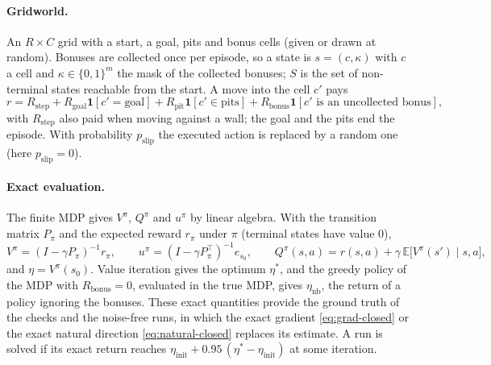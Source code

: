 \documentclass[11pt,a4paper]{article}
\numberwithin{equation}{section}
\theoremstyle{plain}
\theoremstyle{definition}
\theoremstyle{remark}
\newcommand{\E}{\mathbb{E}}
\newcommand{\T}{^{\top}}
\newcommand{\Ind}{\mathbf{1}}
\begin{document}
\paragraph{Gridworld.}
An $R\times C$ grid with a start, a goal, pits and bonus cells (given or drawn at random). Bonuses are collected once per episode, so a state is $s=(c,\kappa)$ with $c$ a cell and $\kappa\in\{0,1\}^m$ the mask of the collected bonuses; $S$ is the set of non-terminal states reachable from
the start. A move into the cell $c'$ pays
\[
  r=R_{\mathrm{step}}+R_{\mathrm{goal}}\Ind[c'=\text{goal}]+R_{\mathrm{pit}}\Ind[c'\in\text{pits}]+R_{\mathrm{bonus}}\Ind[c'\text{ is an uncollected bonus}],
\]
with $R_{\mathrm{step}}$ also paid when moving against a wall; the goal and the pits end the episode. With probability $p_{\mathrm{slip}}$ the executed action is replaced by a random one (here $p_{\mathrm{slip}}=0$).

\paragraph{Exact evaluation.}
The finite MDP gives $V^\pi$, $Q^\pi$ and $u^\pi$ by linear algebra. With the transition matrix $P_\pi$ and the expected reward $r_\pi$ under $\pi$ (terminal states have value $0$),
\[
  V^\pi=(I-\gamma P_\pi)^{-1}r_\pi,\qquad
  u^\pi=(I-\gamma P_\pi\T)^{-1}e_{s_0},\qquad
  Q^\pi(s,a)=r(s,a)+\gamma\,\E\bigl[V^\pi(s')\mid s,a\bigr],
\]
and $\eta=V^\pi(s_0)$. Value iteration gives the optimum $\eta^*$, and the greedy policy of the MDP with $R_{\mathrm{bonus}}=0$, evaluated in the true MDP, gives $\eta_{\mathrm{nb}}$, the return of a policy ignoring the bonuses. These exact quantities provide the
ground truth of the checks and the noise-free runs, in which the exact gradient \eqref{eq:grad-closed} or the exact natural direction \eqref{eq:natural-closed} replaces its estimate. A run is solved if its exact return reaches
$\eta_{\mathrm{init}}+0.95\,(\eta^*-\eta_{\mathrm{init}})$ at some iteration.
\end{document}
